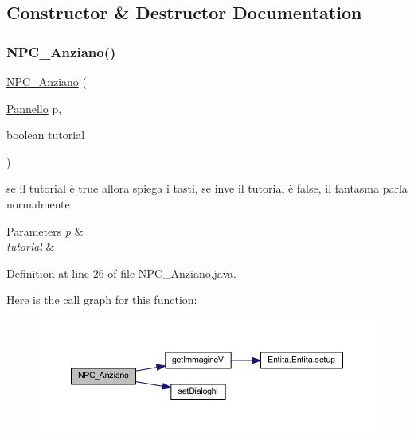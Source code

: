 \subsection{Constructor \& Destructor Documentation}
\mbox{\label{class_entita_1_1_n_p_c___anziano_aef11e153cf80a3e395b957010c566d6b}} 
\subsubsection{\texorpdfstring{N\+P\+C\+\_\+\+Anziano()}{NPC\_Anziano()}}
{\footnotesize\ttfamily \hyperlink{class_entita_1_1_n_p_c___anziano}{N\+P\+C\+\_\+\+Anziano} (\begin{DoxyParamCaption}\item[{\hyperlink{classa_1_1survival_1_1game_1_1_pannello}{Pannello}}]{p,  }\item[{boolean}]{tutorial }\end{DoxyParamCaption})}



se il tutorial è true allora spiega i tasti, se inve il tutorial è false, il fantasma parla normalmente 


\begin{DoxyParams}{Parameters}
{\em p} & \\
\hline
{\em tutorial} & \\
\hline
\end{DoxyParams}


Definition at line 26 of file N\+P\+C\+\_\+\+Anziano.\+java.

Here is the call graph for this function\+:
\nopagebreak
\begin{figure}[H]
\begin{center}
\leavevmode
\includegraphics[width=350pt]{class_entita_1_1_n_p_c___anziano_aef11e153cf80a3e395b957010c566d6b_cgraph}
\end{center}
\end{figure}


